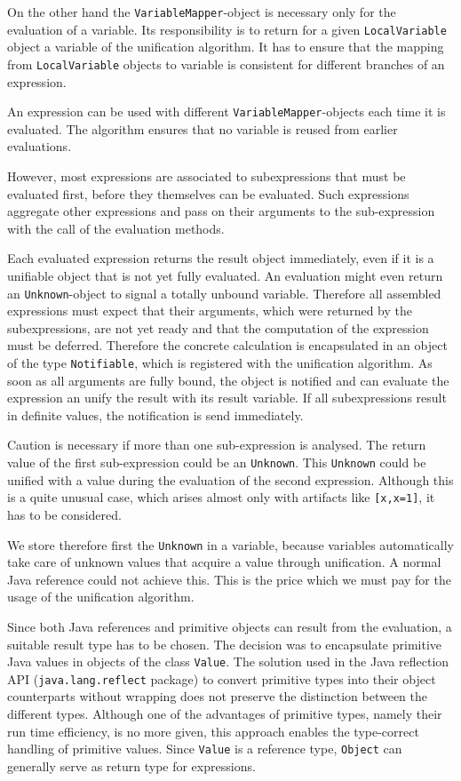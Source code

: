 On the other hand the \texttt{VariableMapper}-object is necessary only for the
evaluation of a variable. Its responsibility is to return
for a given \texttt{LocalVariable}
object a variable of the unification algorithm. It has to ensure that
the mapping from \texttt{LocalVariable}
objects to variable is consistent for different branches of 
an expression.

An expression can be used with different
\texttt{VariableMapper}-objects each time it is evaluated.
The algorithm ensures that no variable is reused from 
earlier evaluations.

However, most expressions are associated to subexpressions that must be
evaluated first, 
before they themselves can be evaluated. Such expressions
aggregate other expressions and pass on their arguments to the
sub-expression with the call of the evaluation methods.

Each evaluated expression returns the result object immediately, even if
it is a unifiable object that is not yet fully evaluated. 
An evaluation might even return an \texttt{Unknown}-object to signal
a totally unbound variable. 
Therefore all assembled expressions must expect
that their arguments, which were returned by the subexpressions,
are not yet ready and that the computation
of the expression must be deferred. Therefore the concrete calculation is
encapsulated in
an object of the type \texttt{Notifiable}, which is registered
with the unification algorithm. As soon as all arguments are fully
bound, the object is notified and can evaluate the expression
an unify the result with its result variable.
If all subexpressions result in definite values, the notification 
is send immediately.

Caution is necessary if more than one sub-expression is analysed. The
return value of the first sub-expression could be an \texttt{Unknown}.
This \texttt{Unknown} could be unified
with a value during the evaluation of the second expression.
Although this is a quite unusual case, which arises almost only with
artifacts like \texttt{[x,x=1]}, it has to be considered.

We store therefore first the \texttt{Unknown} in a
variable, because variables automatically take care of unknown values that
acquire a value through unification. A normal Java reference
could not achieve this. This is the price which we must pay for the
usage of the unification algorithm.

Since both Java references and primitive objects can result from the
evaluation, a suitable result type has to be chosen. The decision
was to encapsulate primitive Java values in objects of the class
\texttt{Value}.
The solution used in the Java reflection API
(\texttt{java.lang.reflect} package) to convert primitive types into their
object counterparts without wrapping does not preserve the distinction
between the different types.
Although one of the advantages of primitive types, namely their run time
efficiency, is no more given, this approach enables the
type-correct handling of primitive values. Since \texttt{Value} is a reference
type, \texttt{Object} can generally serve as return type for expressions.

